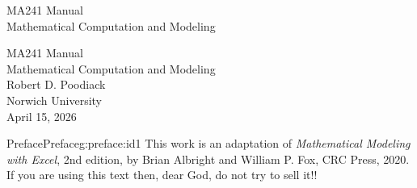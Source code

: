 \documentclass[oneside,10pt,]{book}
\newcommand{\titlepagefont}{\relax}
\numberwithin{equation}{section}
\begin{document}
\frontmatter
\thispagestyle{empty}
{\titlepagefont\centering
\vspace*{0.28\textheight}
{\Huge MA241 Manual}\\[2\baselineskip]
{\LARGE Mathematical Computation and Modeling}\\
}
\clearpage
\thispagestyle{empty}
{\titlepagefont\centering
\vspace*{0.14\textheight}
{\Huge MA241 Manual}\\[\baselineskip]
{\LARGE Mathematical Computation and Modeling}\\[3\baselineskip]
{\Large Robert D. Poodiack}\\[0.5\baselineskip]
{\Large Norwich University}\\[3\baselineskip]
{\Large April 15, 2026}\\}
\clearpage
\thispagestyle{empty}
\null\clearpage
%
%
\typeout{************************************************}
\typeout{************************************************}
%
\begin{preface}{Preface}{}{Preface}{}{}{g:preface:id1}
This work is an adaptation of \emph{Mathematical Modeling with Excel}, 2nd edition, by Brian Albright and William P. Fox, CRC Press, 2020. If you are using this text then, dear God, do not try to sell it!!%
\end{preface}
\setcounter{tocdepth}{0}
\renewcommand*\contentsname{Contents}
\tableofcontents
\mainmatter
%
%
\typeout{************************************************}
\typeout{************************************************}
%
\end{document}
